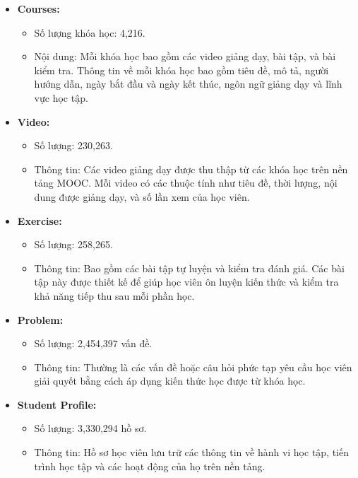 \begin{itemize}
    \item \textbf{Courses:}
    \begin{itemize}
        \item Số lượng khóa học: 4,216.
        \item Nội dung: Mỗi khóa học bao gồm các video giảng dạy, bài tập, và bài kiểm tra. Thông tin về mỗi khóa học bao gồm tiêu đề, mô tả, người hướng dẫn, ngày bắt đầu và ngày kết thúc, ngôn ngữ giảng dạy và lĩnh vực học tập.
    \end{itemize}

    \item \textbf{Video:}
    \begin{itemize}
        \item Số lượng: 230,263.
        \item Thông tin: Các video giảng dạy được thu thập từ các khóa học trên nền tảng MOOC. Mỗi video có các thuộc tính như tiêu đề, thời lượng, nội dung được giảng dạy, và số lần xem của học viên.
    \end{itemize}

    \item \textbf{Exercise:}
    \begin{itemize}
        \item Số lượng: 258,265.
        \item Thông tin: Bao gồm các bài tập tự luyện và kiểm tra đánh giá. Các bài tập này được thiết kế để giúp học viên ôn luyện kiến thức và kiểm tra khả năng tiếp thu sau mỗi phần học.
    \end{itemize}

    \item \textbf{Problem:}
    \begin{itemize}
        \item Số lượng: 2,454,397 vấn đề.
        \item Thông tin: Thường là các vấn đề hoặc câu hỏi phức tạp yêu cầu học viên giải quyết bằng cách áp dụng kiến thức học được từ khóa học.
    \end{itemize}

    \item \textbf{Student Profile:}
    \begin{itemize}
        \item Số lượng: 3,330,294 hồ sơ.
        \item Thông tin: Hồ sơ học viên lưu trữ các thông tin về hành vi học tập, tiến trình học tập và các hoạt động của họ trên nền tảng.
    \end{itemize}


\end{itemize}
